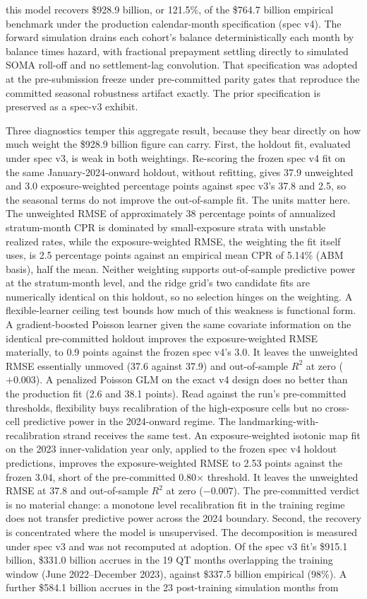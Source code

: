 \documentclass[12pt]{article}
\begin{document}
this model recovers \$928.9 billion, or 121.5\%, of the \$764.7 billion empirical benchmark under the production calendar-month specification (spec v4). The forward simulation drains each cohort's balance deterministically each month by balance times hazard, with fractional prepayment settling directly to simulated SOMA roll-off and no settlement-lag convolution. That specification was adopted at the pre-submission freeze under pre-committed parity gates that reproduce the committed seasonal robustness artifact exactly. The prior specification is preserved as a spec-v3 exhibit.

Three diagnostics temper this aggregate result, because they bear directly on how much weight the \$928.9 billion figure can carry. First, the holdout fit, evaluated under spec v3, is weak in both weightings. Re-scoring the frozen spec v4 fit on the same January-2024-onward holdout, without refitting, gives 37.9 unweighted and 3.0 exposure-weighted percentage points against spec v3's 37.8 and 2.5, so the seasonal terms do not improve the out-of-sample fit. The units matter here. The unweighted RMSE of approximately 38 percentage points of annualized stratum-month CPR is dominated by small-exposure strata with unstable realized rates, while the exposure-weighted RMSE, the weighting the fit itself uses, is 2.5 percentage points against an empirical mean CPR of 5.14\% (ABM basis), half the mean. Neither weighting supports out-of-sample predictive power at the stratum-month level, and the ridge grid's two candidate fits are numerically identical on this holdout, so no selection hinges on the weighting. A flexible-learner ceiling test bounds how much of this weakness is functional form. A gradient-boosted Poisson learner given the same covariate information on the identical pre-committed holdout improves the exposure-weighted RMSE materially, to 0.9 points against the frozen spec v4's 3.0. It leaves the unweighted RMSE essentially unmoved (37.6 against 37.9) and out-of-sample $R^2$ at zero ($+0.003$). A penalized Poisson GLM on the exact v4 design does no better than the production fit (2.6 and 38.1 points). Read against the run's pre-committed thresholds, flexibility buys recalibration of the high-exposure cells but no cross-cell predictive power in the 2024-onward regime. The landmarking-with-recalibration strand receives the same test. An exposure-weighted isotonic map fit on the 2023 inner-validation year only, applied to the frozen spec v4 holdout predictions, improves the exposure-weighted RMSE to 2.53 points against the frozen 3.04, short of the pre-committed 0.80$\times$ threshold. It leaves the unweighted RMSE at 37.8 and out-of-sample $R^2$ at zero ($-0.007$). The pre-committed verdict is no material change: a monotone level recalibration fit in the training regime does not transfer predictive power across the 2024 boundary. Second, the recovery is concentrated where the model is unsupervised. The decomposition is measured under spec v3 and was not recomputed at adoption. Of the spec v3 fit's \$915.1 billion, \$331.0 billion accrues in the 19 QT months overlapping the training window (June 2022--December 2023), against \$337.5 billion empirical (98\%). A further \$584.1 billion accrues in the 23 post-training simulation months from 
\end{document}
